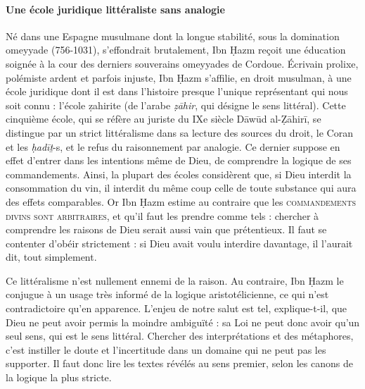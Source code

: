 \paragraph{Une école juridique littéraliste sans analogie}Né dans une Espagne musulmane dont la longue stabilité, sous la
domination omeyyade (756-1031), s'effondrait brutalement, Ibn Ḥazm
reçoit une éducation soignée à la cour des derniers souverains omeyyades
de Cordoue. Écrivain prolixe, polémiste ardent et parfois
injuste, Ibn Ḥazm s'affilie, en droit musulman, à une école juridique
dont il est dans l'histoire presque l'unique représentant qui nous soit
connu : l'école ẓahirite (de l'arabe \emph{ẓāhir}, qui désigne le sens
littéral). Cette cinquième école, qui se réfère au juriste du IXe
siècle Dāwūd al-Ẓāhirī, se distingue par un strict littéralisme dans sa
lecture des sources du droit, le Coran et les \emph{ḥadīṯ}-s, et le
refus du raisonnement par analogie. Ce dernier suppose en effet d'entrer
dans les intentions même de Dieu, de comprendre la logique de ses
commandements. Ainsi, la plupart des écoles considèrent que, si Dieu
interdit la consommation du vin, il interdit du même coup celle de toute
substance qui aura des effets comparables. Or Ibn Ḥazm estime au
contraire que les\textsc{ commandements divins sont arbitraires}, et qu'il faut
les prendre comme tels : chercher à comprendre les raisons de Dieu
serait aussi vain que prétentieux. Il faut se contenter d'obéir
strictement : si Dieu avait voulu interdire davantage, il l'aurait dit,
tout simplement.

Ce littéralisme n'est nullement ennemi de la raison. Au contraire, Ibn
Ḥazm le conjugue à un usage très informé de la logique aristotélicienne,
ce qui n'est contradictoire qu'en apparence. L'enjeu de notre salut est
tel, explique-t-il, que Dieu ne peut avoir permis la moindre ambiguïté :
sa Loi ne peut donc avoir qu'un seul sens, qui est le sens littéral.
Chercher des interprétations et des métaphores, c'est instiller le doute
et l'incertitude dans un domaine qui ne peut pas les supporter. Il faut
donc lire les textes révélés au sens premier, selon les canons de la
logique la plus stricte.

